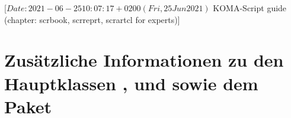 %
%
%
%
%
%
%
%
% 
%
%
%
%

%
                 [$Date: 2021-06-25 10:07:17 +0200 (Fri, 25 Jun 2021) $
                  KOMA-Script guide (chapter: scrbook, scrreprt, scrartcl for
                  experts)]

\chapter[{Zusätzliche Informationen zu den Hauptklassen und 
  \Package{scrextend}}]{Zusätzliche
  Informationen zu den Hauptklassen 
  ,  und
   sowie dem 
  Paket }

